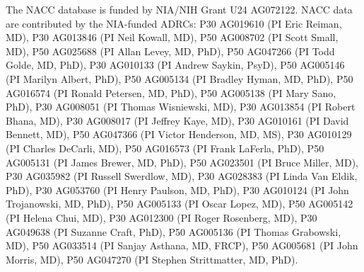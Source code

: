The NACC database is funded by NIA/NIH Grant U24 AG072122. NACC data are contributed by the NIA-funded ADRCs: P30 AG019610 (PI Eric Reiman, MD), P30 AG013846 (PI Neil Kowall, MD), P50 AG008702 (PI Scott Small, MD), P50 AG025688 (PI Allan Levey, MD, PhD), P50 AG047266 (PI Todd Golde, MD, PhD), P30 AG010133 (PI Andrew Saykin, PsyD), P50 AG005146 (PI Marilyn Albert, PhD), P50 AG005134 (PI Bradley Hyman, MD, PhD), P50 AG016574 (PI Ronald Petersen, MD, PhD), P50 AG005138 (PI Mary Sano, PhD), P30 AG008051 (PI Thomas Wisniewski, MD), P30 AG013854 (PI Robert Bhana, MD), P30 AG008017 (PI Jeffrey Kaye, MD), P30 AG010161 (PI David Bennett, MD), P50 AG047366 (PI Victor Henderson, MD, MS), P30 AG010129 (PI Charles DeCarli, MD), P50 AG016573 (PI Frank LaFerla, PhD), P50 AG005131 (PI James Brewer, MD, PhD), P50 AG023501 (PI Bruce Miller, MD), P30 AG035982 (PI Russell Swerdlow, MD), P30 AG028383 (PI Linda Van Eldik, PhD), P30 AG053760 (PI Henry Paulson, MD, PhD), P30 AG010124 (PI John Trojanowski, MD, PhD), P50 AG005133 (PI Oscar Lopez, MD), P50 AG005142 (PI Helena Chui, MD), P30 AG012300 (PI Roger Rosenberg, MD), P30 AG049638 (PI Suzanne Craft, PhD), P50 AG005136 (PI Thomas Grabowski, MD), P50 AG033514 (PI Sanjay Asthana, MD, FRCP), P50 AG005681 (PI John Morris, MD), P50 AG047270 (PI Stephen Strittmatter, MD, PhD).



\newpage



